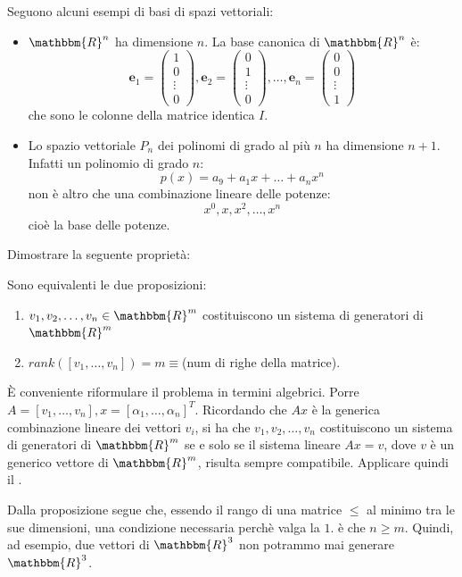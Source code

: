 \documentclass[12pt]{report}
\newcounter{exercise}
\newcounter{proposition}
\newcommand{\namerefl}[1]{%
	\bgroup
	\let\nmu\MakeLowercase
	\nameref{#1}\egroup}
\newcommand{\nmu}{}
\begin{document}
Seguono alcuni esempi di basi di spazi vettoriali:
\begin{itemize}
	\item $\mathbbm{R}^n$ ha dimensione $n$. La base canonica di $\mathbbm{R}^n$ è:
	\[
	\mathbf{e}_1 = \begin{pmatrix}
		1 \\
		0 \\
		\vdots \\
		0
	\end{pmatrix}, \mathbf{e}_2 = \begin{pmatrix}
		0 \\
		1 \\
		\vdots \\
		0
	\end{pmatrix}, \dots, \mathbf{e}_n = \begin{pmatrix}
		0 \\
		0 \\
		\vdots \\
		1
	\end{pmatrix}
	\]
	che sono le colonne della matrice identica $I$.
	\item Lo spazio vettoriale $P_n$ dei polinomi di grado al più $n$ ha dimensione $n+1$. Infatti un polinomio di grado $n$:
	\[
	p(x) = a_9 + a_1x + \dots + a_nx^n
	\]
	non è altro che una combinazione lineare delle potenze:
	\[
	x^0, x, x^2, \dots, x^n
	\]
	cioè la base delle potenze.
\end{itemize}
\begin{exercise}{}{}
\begin{assignment}{}{}
Dimostrare la seguente proprietà:
\begin{proposition}{}{}
Sono equivalenti le due proposizioni:
\begin{enumerate}
	\item $v_1, v_2, \dots, v_n \in \mathbbm{R}^m$ costituiscono un sistema di generatori di $\mathbbm{R}^m$
	\item $rank([v_1, \dots, v_n]) = m \equiv $(num di righe della matrice).
\end{enumerate}
\end{proposition}
\end{assignment}
È conveniente riformulare il problema in termini algebrici. Porre $A = [v_1, \dots, v_n], x = [\alpha_1, \dots, \alpha_n]^T$. Ricordando che $Ax$ è la generica combinazione lineare dei vettori $v_i$, si ha che $v_1, v_2, \dots, v_n$ costituiscono un sistema di generatori di $\mathbbm{R}^m$ se e solo se il sistema lineare $Ax = v$, dove $v$ è un generico vettore di $\mathbbm{R}^m$, risulta sempre compatibile. Applicare quindi il \namerefl{th:rouche_capelli}.

Dalla proposizione segue che, essendo il rango di una matrice $\leq$ al minimo tra le sue dimensioni, una condizione necessaria perchè valga la $1.$ è che $n \geq m$. Quindi, ad esempio, due vettori di $\mathbbm{R}^3$  non potrammo mai generare $\mathbbm{R}^3$.
\end{exercise}
\end{document}
